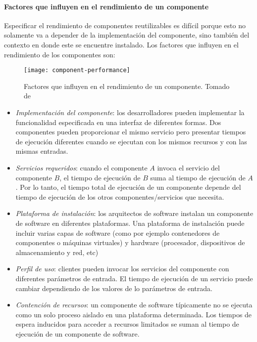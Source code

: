 \paragraph{Factores que influyen en el rendimiento de un componente}
Especificar el rendimiento de componentes reutilizables es difícil porque esto no solamente va a depender de la implementación del componente, sino también del contexto en donde este se encuentre instalado. Los factores que influyen en el rendimiento de los componentes son:

\begin{figure}[h]
  \centering
  \texttt{[image: component-performance]}
  \caption[Factores que influyen en el rendimiento de un componente]{Factores que influyen en el rendimiento de un componente. Tomado de \protect\cite{Koziolek:2010:PEC:1808359.1808729}}
  \label{fig:component-performance}
\end{figure}

\begin{itemize}
    \item \emph{Implementación del componente}: los desarrolladores pueden implementar la funcionalidad especificada en una interfaz de diferentes formas. Dos componentes pueden proporcionar el mismo servicio pero presentar tiempos de ejecución diferentes cuando se ejecutan con los mismos recursos y con las mismas entradas.
    \item \emph{Servicios requeridos}: cuando el componente $A$ invoca el servicio del componente $B$, el tiempo de ejecución de $B$ suma al tiempo de ejecución de $A$. Por lo tanto, el tiempo total de ejecución de un componente depende del tiempo de ejecución de los otros componentes/servicios que necesita.
    \item \emph{Plataforma de instalación}: los arquitectos de software instalan un componente de software en diferentes plataformas. Una plataforma de instalación puede incluir varias capas de software (como por ejemplo contenedores de componentes o máquinas virtuales) y hardware (procesador, dispositivos de almacenamiento y red, etc)
    \item \emph{Perfil de uso}: clientes pueden invocar los servicios del componente con diferentes parámetros de entrada. El tiempo de ejecución de un servicio puede cambiar dependiendo de los valores de lo parámetros de entrada.
    \item \emph{Contención de recursos}: un componente de software típicamente no se ejecuta como un solo proceso aislado en una plataforma determinada. Los tiempos de espera inducidos para acceder a recursos limitados se suman al tiempo de ejecución de un componente de software.
\end{itemize}

